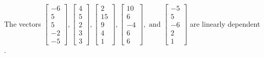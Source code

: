 \begin{exercise}
\begin{exerciseStatement}
  \end{exerciseStatement}
  \begin{exerciseAnswer}
   The vectors \(\left[\begin{array}{r}
-6 \\
5 \\
5 \\
-2 \\
-5
\end{array}\right] , \left[\begin{array}{r}
4 \\
5 \\
2 \\
3 \\
3
\end{array}\right] , \left[\begin{array}{r}
2 \\
15 \\
9 \\
4 \\
1
\end{array}\right] , \left[\begin{array}{r}
10 \\
6 \\
-4 \\
6 \\
6
\end{array}\right] , \text{ and } \left[\begin{array}{r}
-5 \\
5 \\
-6 \\
2 \\
1
\end{array}\right]\) are 
  	 linearly dependent  .
  


  \end{exerciseAnswer}
\end{exercise}